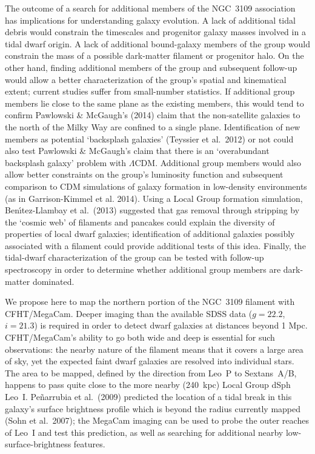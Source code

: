The outcome of a search for additional members of the NGC~3109 association has  implications for
understanding galaxy evolution. A lack of additional tidal debris would constrain the timescales and 
progenitor galaxy masses involved in a tidal dwarf origin.
A lack of additional bound-galaxy members of the group  would constrain the mass of a possible dark-matter filament or progenitor halo.
On the other hand, finding additional members of the group and subsequent follow-up would allow a better characterization of 
the group's spatial and kinematical extent; current studies  suffer from small-number statistics. If additional group members lie close to the same plane
as the existing members, this would tend to confirm Pawlowski \& McGaugh's (2014) claim
that the non-satellite galaxies to the north of the Milky Way are confined to a single plane.
Identification of new members as potential `backsplash galaxies' (Teyssier et al.\ 2012) or not  could also test
Pawlowski \& McGaugh's claim that there is an `overabundant backsplash galaxy' problem with $\Lambda$CDM.
Additional group members  would also allow better constraints on the group's  luminosity function and subsequent comparison to CDM 
simulations of galaxy formation in  low-density environments (as in Garrison-Kimmel et al. 2014).
Using a Local Group formation simulation, Ben{\'{\i}}tez-Llambay et al.\ (2013) suggested that gas removal through 
stripping by the `cosmic web' of filaments and pancakes could explain the diversity of properties of local dwarf galaxies;
identification of additional galaxies possibly associated with a filament could provide additional tests of this idea.
Finally, the tidal-dwarf characterization of the group can be tested with follow-up spectroscopy in order to determine
whether additional group members are dark-matter dominated.

We propose here to map the northern portion of  the NGC~3109 filament with CFHT/MegaCam. 
Deeper imaging than the available  SDSS  data ($g=22.2$, $i=21.3$) is required in order to detect dwarf galaxies at distances beyond 1 Mpc.
CFHT/MegaCam's ability to go both wide and deep is essential for such observations: the nearby nature of the 
filament means that it covers a large area of sky, yet the expected faint dwarf galaxies are resolved into individual stars.
The area to be mapped, defined  by the direction from Leo~P to Sextans~A/B, happens to pass quite close
to the more nearby (240~kpc) Local Group dSph Leo~I. Pe{\~n}arrubia et al.\ (2009) predicted the location
of a tidal break in this galaxy's surface brightness profile which is beyond the radius currently mapped (Sohn et al.\ 2007);
the MegaCam imaging can be used to probe the outer reaches of Leo~I and test this prediction, as well as searching
for additional nearby low-surface-brightness features.


